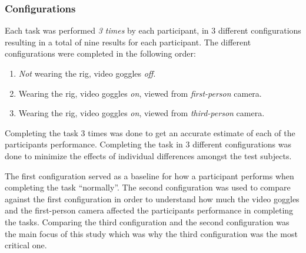 \documentclass[runningheads,a4paper,oribibl]{llncs}
\begin{document}
\subsubsection{Configurations} \label{subsubsec:Configurations}
Each task was performed \emph{3 times} by each participant, in 3 different configurations resulting in a total of nine results for each participant. The different configurations were completed in the following order:
\begin{enumerate}
	\item \emph{Not} wearing the rig, video goggles \emph{off}.
	\item Wearing the rig, video goggles \emph{on}, viewed from \emph{first-person} camera.
	\item Wearing the rig, video goggles \emph{on}, viewed from \emph{third-person} camera.
\end{enumerate} 

Completing the task 3 times was done to get an accurate estimate of each of the participants performance. Completing the task in 3 different configurations was done to minimize the effects of individual differences amongst the test subjects. 

The first configuration served as a baseline for how a participant performs when completing the task ``normally''. The second configuration was used to compare against the first configuration in order to understand how much the video goggles and the first-person camera affected the participants performance in completing the tasks. Comparing the third configuration and the second configuration was the main focus of this study which was why the third configuration was the most critical one.
\end{document}
